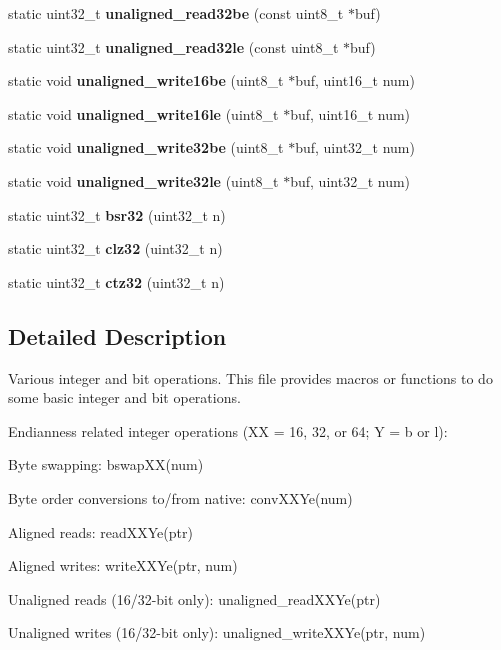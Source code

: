 \begin{DoxyCompactItemize}
\item 
static uint32\-\_\-t {\bfseries unaligned\-\_\-read32be} (const uint8\-\_\-t $\ast$buf)\label{tuklib__integer_8h_a32dbc938f43376657e411cb6a6285fb5}

\item 
static uint32\-\_\-t {\bfseries unaligned\-\_\-read32le} (const uint8\-\_\-t $\ast$buf)\label{tuklib__integer_8h_a29527305cc7fb6ba4b4fe8f6f44d2147}

\item 
static void {\bfseries unaligned\-\_\-write16be} (uint8\-\_\-t $\ast$buf, uint16\-\_\-t num)\label{tuklib__integer_8h_a822e6b949cf0f6606754e315b015421e}

\item 
static void {\bfseries unaligned\-\_\-write16le} (uint8\-\_\-t $\ast$buf, uint16\-\_\-t num)\label{tuklib__integer_8h_a36528cdd7dbf52b7c4aa438fc3c6619b}

\item 
static void {\bfseries unaligned\-\_\-write32be} (uint8\-\_\-t $\ast$buf, uint32\-\_\-t num)\label{tuklib__integer_8h_a2283faf2589131fb98468fa6a2238d5d}

\item 
static void {\bfseries unaligned\-\_\-write32le} (uint8\-\_\-t $\ast$buf, uint32\-\_\-t num)\label{tuklib__integer_8h_a80a90d3c7e8bde942b718aefc4eb6e8f}

\item 
static uint32\-\_\-t {\bfseries bsr32} (uint32\-\_\-t n)\label{tuklib__integer_8h_ace3a388259583931adc6cb3a2f5a8167}

\item 
static uint32\-\_\-t {\bfseries clz32} (uint32\-\_\-t n)\label{tuklib__integer_8h_a108e65d5fe1aae56171dee1be2dcb0a4}

\item 
static uint32\-\_\-t {\bfseries ctz32} (uint32\-\_\-t n)\label{tuklib__integer_8h_a80e9adeba7b4eea789a09ad5e6683d04}

\end{DoxyCompactItemize}


\subsection{Detailed Description}
Various integer and bit operations. This file provides macros or functions to do some basic integer and bit operations.

Endianness related integer operations (X\-X = 16, 32, or 64; Y = b or l)\-:
\begin{DoxyItemize}
\item Byte swapping\-: bswap\-X\-X(num)
\item Byte order conversions to/from native\-: conv\-X\-X\-Ye(num)
\item Aligned reads\-: read\-X\-X\-Ye(ptr)
\item Aligned writes\-: write\-X\-X\-Ye(ptr, num)
\item Unaligned reads (16/32-\/bit only)\-: unaligned\-\_\-read\-X\-X\-Ye(ptr)
\item Unaligned writes (16/32-\/bit only)\-: unaligned\-\_\-write\-X\-X\-Ye(ptr, num)
\end{DoxyItemize}

